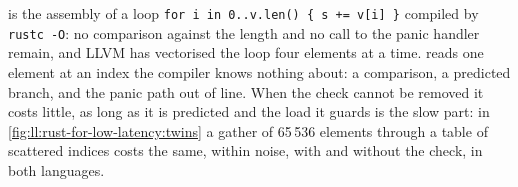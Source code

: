  is the assembly of a loop \texttt{for i in 0..v.len() \{ s += v[i] \}} compiled
by \texttt{rustc -O}: no comparison against the length and no call to the panic handler remain, and LLVM has vectorised the
loop four elements at a time.  reads one element at an index the compiler knows
nothing about: a comparison, a predicted branch, and the panic path out of line. When the check cannot be removed it costs
little, as long as it is predicted and the load it guards is the slow part: in
\cref{fig:ll:rust-for-low-latency:twins} a gather of 65\,536 elements through a table of scattered indices costs the same,
within noise, with and without the check, in both languages.

\label{lst:ll:rust-for-low-latency:counted}

\label{lst:ll:rust-for-low-latency:checked}

